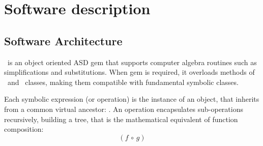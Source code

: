 
\section{Software description}
\label{sec:description}


\subsection{Software Architecture}
\label{sec:architecture}


\ragnicas~is an object oriented ASD gem that supports computer algebra routines such as simplifications and substitutions. When gem is required, it overloads methods of \Fixnum~and \Float~classes, making them compatible with fundamental symbolic classes.

Each symbolic expression (or operation) is the instance of an object, that inherits from a common virtual ancestor: \CASOp. An operation encapsulates sub-operations recursively, building a tree, that is the mathematical equivalent of function composition:
\begin{equation}
\left( f \, \circ \, g \right)
\end{equation}

